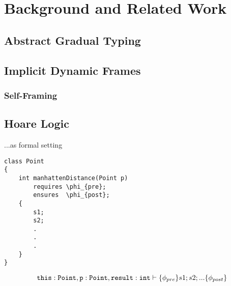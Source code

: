 \chapter{Background and Related Work}

\section{Abstract Gradual Typing}


\section{Implicit Dynamic Frames}
\subsection{Self-Framing}

\section{Hoare Logic}
...as formal setting

\begin{verbatim}
class Point
{
    int manhattenDistance(Point p)
        requires \phi_{pre};
        ensures  \phi_{post};
    {
        s1;
        s2;
        .
        .
        .
    }
}
\end{verbatim}

\begin{displaymath}
{\texttt{this}: \texttt{Point}, \texttt{p} : \texttt{Point}, \texttt{result}: \texttt{int}} \vdash \{{\phi_{pre}}\} {s1; s2; ...} \{{\phi_{post}}\}
\end{displaymath}